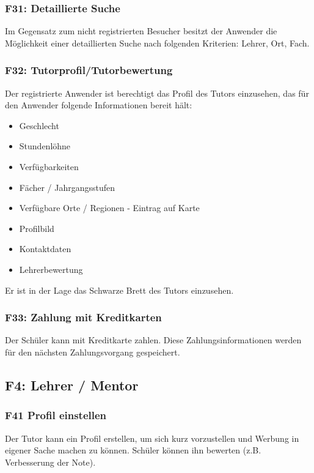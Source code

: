 \documentclass[10pt,a4paper]{scrartcl}
\begin{document}
\subsubsection*{F31: Detaillierte Suche}

Im Gegensatz zum nicht registrierten Besucher besitzt der Anwender die Möglichkeit einer detaillierten Suche nach folgenden Kriterien: Lehrer, Ort, Fach.

\subsubsection*{F32: Tutorprofil/Tutorbewertung}

Der registrierte Anwender ist berechtigt das Profil des Tutors einzusehen, das für den Anwender folgende Informationen bereit hält:

\begin{itemize}
	\item Geschlecht
	\item Stundenlöhne 
	\item Verfügbarkeiten 
	\item Fächer / Jahrgangsstufen 
	\item Verfügbare Orte / Regionen - Eintrag auf Karte
	\item Profilbild
	\item Kontaktdaten
	\item Lehrerbewertung
\end{itemize}
	
Er ist in der Lage das Schwarze Brett des Tutors einzusehen.

\subsubsection*{F33: Zahlung mit Kreditkarten}
Der Schüler kann mit Kreditkarte zahlen. Diese Zahlungsinformationen werden für den nächsten Zahlungsvorgang gespeichert.


\subsection{F4: Lehrer / Mentor}
\subsubsection*{F41 Profil einstellen}
Der Tutor kann ein Profil erstellen, um sich kurz vorzustellen und Werbung in eigener Sache machen zu können. Schüler können ihn bewerten (z.B. Verbesserung der Note).
\end{document}
